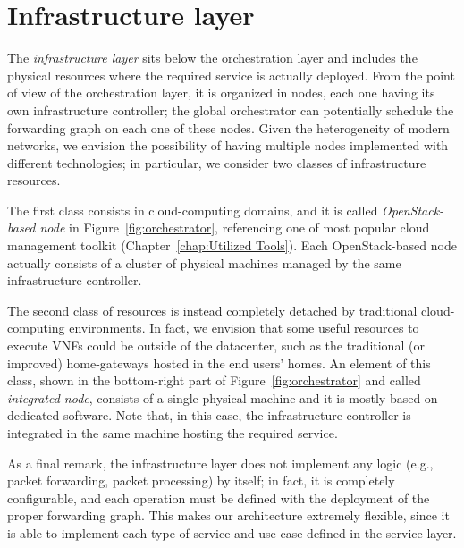
\section{Infrastructure layer}

The \textit{infrastructure layer} sits below the orchestration layer and includes the physical resources where the required service is actually deployed.
From the point of view of the orchestration layer, it is organized in nodes, each one having its own infrastructure controller; the global orchestrator can potentially schedule the forwarding graph on each one of these nodes.
Given the heterogeneity of modern networks, we envision the possibility of having multiple nodes implemented with different technologies; in particular, we consider two classes of infrastructure resources.

The first class consists in cloud-computing domains, and it is called \textit{OpenStack-based node} in Figure~\ref{fig:orchestrator}, referencing one of most popular cloud management toolkit (Chapter~\ref{chap:Utilized Tools}).  
Each OpenStack-based node actually consists of a cluster of physical machines managed by the same infrastructure controller.

The second class of resources is instead completely detached by traditional cloud-computing environments. 
In fact, we envision that some useful resources to execute VNFs could be outside of the datacenter, such as the 
traditional (or improved) home-gateways hosted in the end users' homes. 
An element of this class, shown in the bottom-right part of Figure~\ref{fig:orchestrator} and called \textit{integrated node}, consists of a single physical machine and it is mostly based on dedicated software.
Note that, in this case, the infrastructure controller is integrated in the same machine hosting the required service.

As a final remark, the infrastructure layer does not implement any logic (e.g., packet forwarding, packet processing) by itself; in fact, it is completely configurable, and each operation must be defined with the deployment of the proper forwarding graph.
This makes our architecture extremely flexible, since it is able to implement each type of service and use case defined in the service layer.

